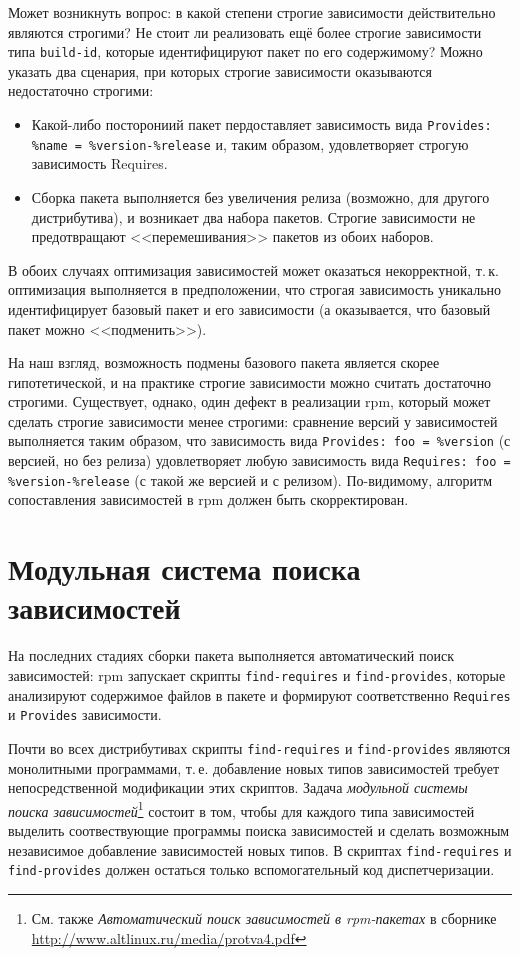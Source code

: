 \documentclass[russian,a4paper,12pt,titlepage]{article}
\begin{document}
Может возникнуть вопрос: в какой степени строгие зависимости действительно являются строгими?
Не стоит ли реализовать ещё более строгие зависимости типа \verb|build-id|, которые идентифицируют пакет по его содержимому?
Можно указать два сценария, при которых строгие зависимости оказываются недостаточно строгими:
\begin{itemize}
\item Какой-либо посторониий пакет пердоставляет зависимость вида \verb|Provides: %name = %version-%release| и,
таким образом, удовлетворяет строгую зависимость Requires.
\item Сборка пакета выполняется без увеличения релиза (возможно, для другого дистрибутива), и возникает два набора пакетов.
Строгие зависимости не предотвращают <<перемешивания>> пакетов из обоих наборов.
\end{itemize}
В обоих случаях оптимизация зависимостей может оказаться некорректной, т.\,к. оптимизация выполняется в предположении,
что строгая зависимость уникально идентифицирует базовый пакет и его зависимости (а оказывается, что базовый пакет можно <<подменить>>).

На наш взгляд, возможность подмены базового пакета является скорее гипотетической, и на практике строгие зависимости
можно считать достаточно строгими.  Существует, однако, один дефект в реализации rpm, который может сделать строгие
зависимости менее строгими: сравнение версий у зависимостей выполняется таким образом, что зависимость вида
\verb|Provides: foo = %version| (с версией, но без релиза) удовлетворяет любую зависимость вида
\verb|Requires: foo = %version-%release| (с такой же версией и с релизом).
По-видимому, алгоритм сопоставления зависимостей в rpm должен быть скорректирован.

\section{Модульная система поиска зависимостей}
На последних стадиях сборки пакета выполняется автоматический поиск зависимостей:
rpm запускает скрипты \verb|find-requires| и \verb|find-provides|, которые анализируют
содержимое файлов в пакете и формируют соответственно \verb|Requires| и \verb|Provides| зависимости.

Почти во всех дистрибутивах скрипты \verb|find-requires| и \verb|find-provides| являются
монолитными программами, т.\,е. добавление новых типов зависимостей требует непосредственной модификации
этих скриптов.  Задача \textit{модульной системы поиска зависимостей}\footnote{См. также
\textit{Автоматический поиск зависимостей в rpm-пакетах} в сборнике
\url{http://www.altlinux.ru/media/protva4.pdf}}
состоит в том, чтобы для каждого типа зависимостей выделить соотвествующие программы поиска зависимостей
и сделать возможным независимое добавление зависимостей новых типов.  В скриптах \verb|find-requires| и \verb|find-provides|
должен остаться только вспомогательный код диспетчеризации.
\end{document}
